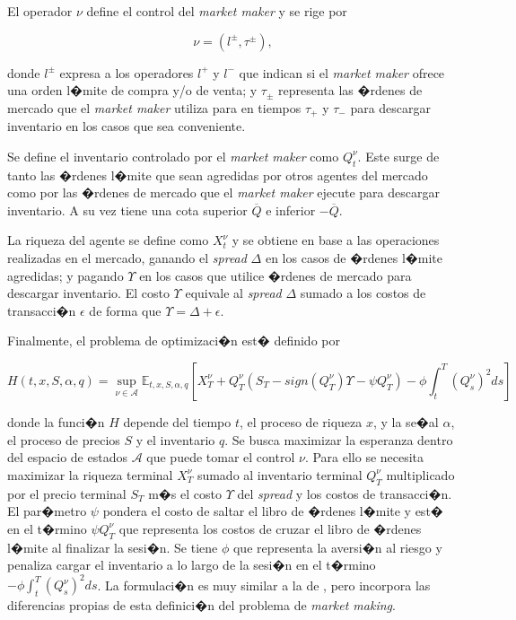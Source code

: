 \documentclass[12pt,a4paper,spanish]{article}%
\begin{document}
El operador $\nu$ define el control del \textit{market maker} y se rige por

\begin{equation}
	\nu = (l^{\pm}, \tau^{\pm}),
	\label{nu}
\end{equation}

donde $l^{\pm}$ expresa a los operadores $l^+$ y $l^-$ que indican si el \textit{market maker} ofrece una orden l�mite de compra y/o de venta; y $\tau_{\pm}$ representa las �rdenes de mercado que el \textit{market maker} utiliza para en tiempos $\tau_+$ y $\tau_-$ para descargar inventario en los casos que sea conveniente.

Se define el inventario controlado por el \textit{market maker} como $Q_t^\nu$. Este surge de tanto las �rdenes l�mite que sean agredidas por otros agentes del mercado como por las �rdenes de mercado que el \textit{market maker} ejecute para descargar inventario. A su vez tiene una cota superior $\overline{Q}$ e inferior $-\overline{Q}$.

La riqueza del agente se define como $X_t^\nu$ y se obtiene en base a las operaciones realizadas en el mercado, ganando el \textit{spread} $\Delta$ en los casos de �rdenes l�mite agredidas; y pagando $\Upsilon$ en los casos que utilice �rdenes de mercado para descargar inventario. El costo $\Upsilon$ equivale al \textit{spread} $\Delta$ sumado a los costos de transacci�n $\epsilon$ de forma que $\Upsilon= \Delta + \epsilon$. 

Finalmente, el problema de optimizaci�n est� definido por

\begin{equation}
	H(t,x,S,\alpha,q) = 
	\sup_{\nu \in \mathcal{A}} \mathbb{E}_{t,x,S,\alpha,q} [X_{T}^\nu + Q_T^\nu(S_T-sign(Q_T^\nu)\Upsilon-\psi Q_T^\nu) - \phi \int_{t}^{T}(Q_s^\nu)^2ds]
	\label{optimizacion}
\end{equation}

donde la funci�n $H$ depende del tiempo $t$, el proceso de riqueza $x$, y la se�al $\alpha$, el proceso de precios $S$ y el inventario $q$. Se busca maximizar la esperanza dentro del espacio de estados $\mathcal{A}$ que puede tomar el control $\nu$. Para ello se necesita maximizar la riqueza terminal $X_T^\nu$ sumado al inventario terminal $Q_T^\nu$ multiplicado por el precio terminal $S_T$ m�s el costo $\Upsilon$ del \textit{spread} y los costos de transacci�n. El par�metro $\psi$ pondera el costo de saltar el libro de �rdenes l�mite y est� en el t�rmino $\psi Q_T^\nu$ que representa los costos de cruzar el libro de �rdenes l�mite al finalizar la sesi�n. Se tiene $\phi$ que representa la aversi�n al riesgo y penaliza cargar el inventario a lo largo de la sesi�n en el t�rmino $- \phi \int_{t}^{T}(Q_s^\nu)^2ds$. La formulaci�n es muy similar a la de \cite{Avellaneda2008}, pero incorpora las diferencias propias de esta definici�n del problema de \textit{market making}.
\end{document}
